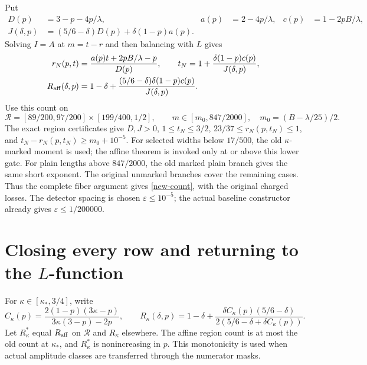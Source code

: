 \documentclass[10pt,a4paper]{article}
\newcommand{\Raff}{R_{\rm aff}}
\newcommand{\Rold}{R_{\kappa}}
\newcommand{\Reg}{\mathcal R}
\begin{document}
Put
\begin{align*}
 D(p)&=3-p-4p/\lambda,& a(p)&=2-4p/\lambda,& c(p)&=1-2pB/\lambda,\\
 J(\delta,p)&=(5/6-\delta)D(p)+\delta(1-p)a(p).
\end{align*}
Solving $I=A$ at $m=t-r$ and then balancing with $L$ gives
\begin{align}
 r_N(p,t)&=\frac{a(p)t+2pB/\lambda-p}{D(p)},\qquad
 t_N=1+\frac{\delta(1-p)c(p)}{J(\delta,p)},\nonumber\\
 \Raff(\delta,p)&=1-\delta+
 \frac{(5/6-\delta)\delta(1-p)c(p)}{J(\delta,p)}.\label{new-count}
\end{align}
Use this count on
\[
 \Reg=[89/200,97/200]\times[199/400,1/2],\qquad
 m\in[m_0,847/2000],\quad m_0=(B-\lambda/25)/2.
\]
The exact region certificates give $D,J>0$, $1\leq t_N\leq3/2$,
$23/37\leq r_N(p,t_N)\leq1$, and
$t_N-r_N(p,t_N)\geq m_0+10^{-5}$.
For selected widths below $17/500$, the old $\kappa$-marked moment is used;
the affine theorem is invoked only at or above this lower gate. For plain lengths
above $847/2000$, the old marked plain branch gives the same short exponent.
The original unmarked branches cover the remaining cases. Thus the complete
fiber argument gives \eqref{new-count}, with the original charged losses.
The detector spacing is chosen $\varepsilon\leq10^{-5}$; the actual baseline
constructor already gives $\varepsilon\leq1/200000$.

\section{Closing every row and returning to the $L$-function}
For $\kappa\in[\kappa_*,3/4]$, write
\[
 C_\kappa(p)=\frac{2(1-p)(3\kappa-p)}{3\kappa(3-p)-2p},\qquad
 \Rold(\delta,p)=1-\delta+
 \frac{\delta C_\kappa(p)(5/6-\delta)}{2(5/6-\delta+\delta C_\kappa(p))}.
\]
Let $R^*_{\kappa}$ equal $\Raff$ on $\Reg$ and $\Rold$ elsewhere.
The affine region count is at most the old count at $\kappa_*$, and
$R^*_{\kappa}$ is nonincreasing in $p$. This monotonicity is used when
actual amplitude classes are transferred through the numerator masks.
\end{document}
